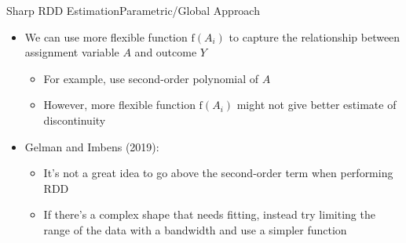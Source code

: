 \documentclass[hyperref={pdfpagelabels=false}]{beamer}
\begin{document}
\begin{frame}{Sharp RDD Estimation}{Parametric/Global Approach}
	\begin{itemize}
		
		
		
		\item We can use more flexible function $\mathrm{f}(A_i)$ to capture the relationship between assignment variable $A$ and outcome $Y$
									\vspace{0.2cm}
			\begin{itemize}
			\item For example, use second-order polynomial of $A$
							\vspace{0.2cm}
		\item However, more flexible function $\mathrm{f}(A_i)$ might not give better estimate of discontinuity  
					\vspace{0.2cm}
				\end{itemize}		
		\item Gelman and Imbens (2019): 
							\vspace{0.2cm}
			\begin{itemize}
		\item It's not a great idea to go above the second-order term when performing RDD
						\vspace{0.2cm}
	
	\item If there's a complex shape that needs fitting, instead try limiting the range of the data with a bandwidth and use a simpler function
		\end{itemize}
	\end{itemize}
\end{frame}
\end{document}
